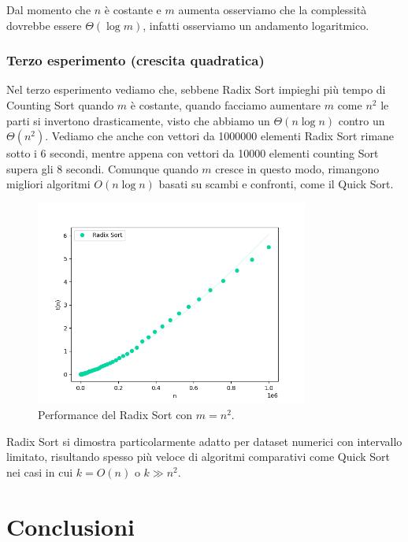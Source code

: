 \documentclass[a4paper, 12pt, oneside]{book}
\begin{document}
\noindent Dal momento che $n$ è costante e $m$ aumenta osserviamo che la complessità dovrebbe essere $\Theta(\log m)$, infatti osserviamo un andamento logaritmico.


\subsection{Terzo esperimento (crescita quadratica)}

Nel terzo esperimento vediamo che, sebbene Radix Sort impieghi più tempo di Counting Sort quando \(m\) è costante, quando facciamo aumentare \(m\) come \(n^2\) le parti si invertono drasticamente, visto che abbiamo un \(\Theta(n \log n)\) contro un \(\Theta(n^2)\).
Vediamo che anche con vettori da 1000000 elementi Radix Sort rimane sotto i 6 secondi, mentre appena con vettori da 10000 elementi counting Sort supera gli 8 secondi. Comunque quando \(m\) cresce in questo modo, rimangono migliori algoritmi \(O(n \log n)\) basati su scambi e confronti, come il Quick Sort.

\begin{figure}[H]
    \centering
    \includegraphics[width=0.8\textwidth]{images/radixsort_nlogn.png}
    \caption{Performance del Radix Sort con \(m = n^2\).}
    \label{fig:radix_sort_3_way_m}
\end{figure}

\noindent Radix Sort si dimostra particolarmente adatto per dataset numerici con intervallo limitato, risultando spesso più veloce di algoritmi comparativi come Quick Sort nei casi in cui \(k = O(n)\) o \(k \gg n^2\).




\chapter{Conclusioni}\label{chap:Conclusioni} %
\end{document}
